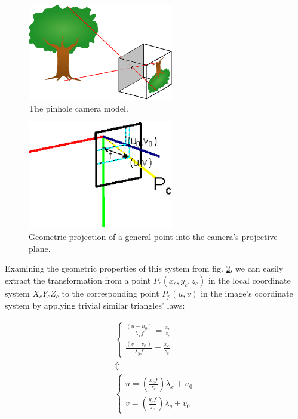 \begin{figure}[htbp]
\centering
\includegraphics[width=2.5in]{./Graphics/pinhole_camera}
\caption{The pinhole camera model. \label{fig:pinhole_camera}}
\end{figure}
\begin{figure}[htbp]
\centering
\includegraphics[width=2.5in]{./Graphics/camera_intrinsics}
\caption{Geometric projection of a general point into the camera's projective
plane. \label{fig:intrinsics}}
\end{figure}
Examining the geometric properties of this system from fig. \ref{fig:intrinsics}, we can easily extract the
transformation from a point $P_c(x_c,y_c,z_c)$ in the local coordinate system
$X_cY_cZ_c$ to the corresponding point $P_p(u,v)$ in the image's coordinate
system by applying trivial similar triangles' laws:

\[
  \begin{array}{c}
    \left\{\begin{array}{c}
    \frac{(u-u_0)}{\lambda _x f}=\frac{x_c}{z_c} \\
    \frac{(v-v_0)}{\lambda _y f}=\frac{x_c}{z_c}
  \end{array}
  \right. \\
  \Updownarrow \\
  \left\{\begin{array}{c}
      u=\left(\frac{x_c f}{z_c}\right) \lambda _x+u_0 \\
      v=\left(\frac{y_c f}{z_c}\right) \lambda _y+v_0
    \end{array}
    \right. 
  \end{array}
\]

